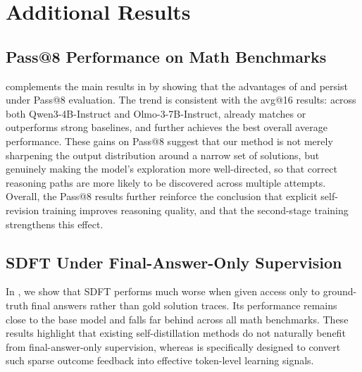 \section{Additional Results}
\label{app:additionalresults}
\subsection{Pass@8 Performance on Math Benchmarks}
 complements the main results in  by showing that the advantages of \sft{} and \ours{} persist under Pass@8 evaluation. The trend is consistent with the avg@16 results: across both Qwen3-4B-Instruct and Olmo-3-7B-Instruct, \sft{} already matches or outperforms strong baselines, and \ours{} further achieves the best overall average performance. These gains on Pass@8 suggest that our method is not merely sharpening the output distribution around a narrow set of solutions, but genuinely making the model’s exploration more well-directed, so that correct reasoning paths are more likely to be discovered across multiple attempts. Overall, the Pass@8 results further reinforce the conclusion that explicit self-revision training improves reasoning quality, and that the second-stage \ours{} training strengthens this effect.



\subsection{SDFT Under Final-Answer-Only Supervision}
\label{app:sdsf-final-answers}
In , we show that SDFT performs much worse when given access only to ground-truth final answers rather than gold solution traces. Its performance remains close to the base model and falls far behind \ours{} across all math benchmarks. These results highlight that existing self-distillation methods do not naturally benefit from final-answer-only supervision, whereas \ours{} is specifically designed to convert such sparse outcome feedback into effective token-level learning signals.



